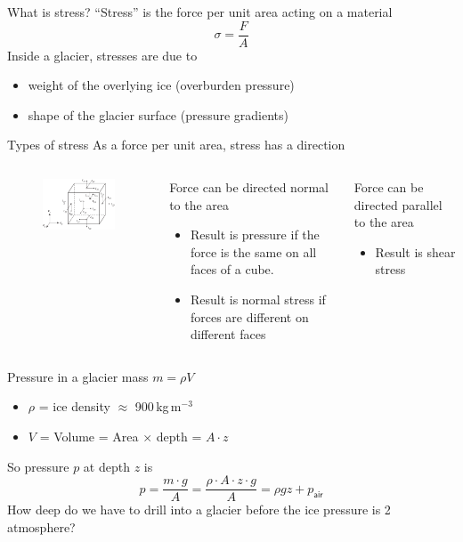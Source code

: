\documentclass[hide notes,intlimits,unknownkeysallowed]{beamer}
\begin{document}
\begin{frame}{What is stress?}
  ``Stress'' is the force per unit area acting on a material
  \begin{displaymath}
    \sigma = \frac{F}{A}
  \end{displaymath}
  Inside a glacier, stresses are due to
  \begin{itemize}
  \item weight of the overlying ice (overburden pressure)
  \item shape of the glacier surface (pressure gradients)
  \end{itemize}
\end{frame}


\begin{frame}{Types of stress}
  As a force per unit area, stress has a direction
  \begin{columns}
    \column[c]{5cm}
    \begin{figure}
      \includegraphics[width=4.75cm]{fig_3_08}
    \end{figure}
    \column[c]{6.5cm}
   \begin{block}{}
      Force can be directed normal to the area
      \begin{itemize}
      \item Result is \alert{pressure} if the force is the same on all faces of a cube.
      \item Result is \alert{normal stress} if forces are different on different faces
      \end{itemize}
    \end{block}
    \begin{block}{} 
      Force can be directed parallel to the area
      \begin{itemize}
      \item Result is \alert{shear stress}
      \end{itemize}
    \end{block}
  \end{columns}
\end{frame}

\begin{frame}{Pressure in a glacier}
  mass $m = \rho V$
     \begin{itemize}
      \item $\rho$ = ice density $\approx$ 900\,kg\,m$^{-3}$
      \item$V$ = Volume = Area $\times$ depth = $A \cdot z$
     \end{itemize}
     So pressure $p$ at depth $z$ is
     \begin{displaymath}
       p = \frac{m \cdot g}{A} = \frac{\rho \cdot A \cdot z \cdot g}{A} = \rho g z + p_{\textsf{air}}
     \end{displaymath}
     How deep do we have to drill into a glacier before the ice pressure is 2 atmosphere?
\end{frame}
\end{document}
